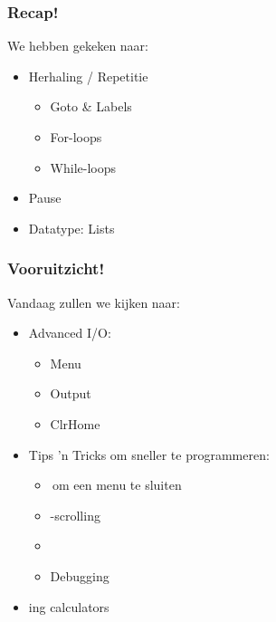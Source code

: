 
\begin{frame}
\frametitle{Recap!}


We hebben gekeken naar:
\begin{itemize}
	\item<2-> Herhaling / Repetitie
		\begin{itemize}
		  \item<3-> Goto \& Labels
		  \item<4-> For-loops
		  \item<5-> While-loops
		\end{itemize}
	\item<6-> Pause
	\item<7-> Datatype: Lists
\end{itemize}
\end{frame}

\begin{frame}
\frametitle{Vooruitzicht!}

Vandaag zullen we kijken naar:
\begin{itemize}
	\item<2-> Advanced I/O:
		\begin{itemize}
		  \item<3-> Menu
		  \item<4-> Output
		  \item<5-> ClrHome
		\end{itemize}
	\item<6-> Tips 'n Tricks om sneller te programmeren:
		\begin{itemize}
		  \item<7-> \tiCLEAR\,om een menu te sluiten
		  \item<8-> \tiALPHA-scrolling
		  \item<9-> \tiCATALOG
		  \item<10-> Debugging
		\end{itemize}	
	\item<11-> \tiLINK ing calculators
\end{itemize}

\end{frame}


